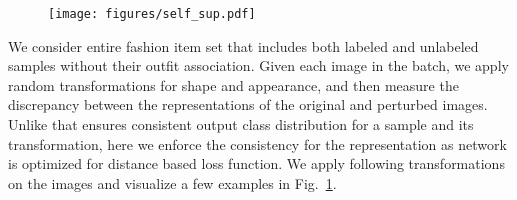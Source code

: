 \documentclass[sigconf]{acmart}
\begin{document}
\begin{comment}
\begin{minipage}[b]{0.45\textwidth}
    \texttt{[image: figures/self\_sup.pdf]}
    \captionof{figure}{Examples showing different \textit{shape} () and \textit{appearance} transformations () of the original images (first column). Refer Sec. \ref{sec:l_ss} for details.}
    \label{fig:self_su}
\end{minipage}\qquad
\begin{minipage}[b]{0.45\textwidth}
\centering
    \captionof{table}{Statistics of Polyvore, Polyvore-D and newly created fashion dataset in terms of number of outfits in train, validation and test splits. We also mention overall fashion items in these datasets. Our dataset has 10 times more outfits than existing datasets.}
    \setlength{\tabcolsep}{5pt}
\begin{tabular}{l|cccc}
    \hline
        Dataset & Train & Validation & Test & \#items \\
        \hline
        Polyvore &  &  &  &  \\
        Polyvore-D &  & - &  &  \\
        Fashion Outfits &  &  &  &  \\
        \hline
    \end{tabular}
\label{table:datasets}
\end{minipage}
\end{comment}

\begin{figure}
    \centering
    \texttt{[image: figures/self\_sup.pdf]}
    \label{fig:self_su}
    
\vspace{-3mm}
\end{figure}


We consider entire fashion item set  that includes both labeled and unlabeled samples without their outfit association. Given each image in the batch, we apply random transformations for shape and appearance, and then measure the discrepancy between the representations of the original and perturbed images. Unlike \cite{berthelot2019mixmatch,yun2019cutmix} that ensures consistent output class distribution for a sample and its transformation, here we enforce the consistency for the representation as network is optimized for distance based loss function. We apply following transformations on the images and visualize a few examples in Fig.~\ref{fig:self_su}.
\end{document}
